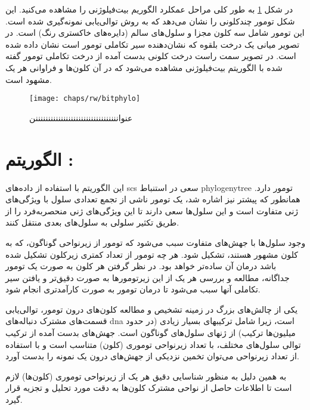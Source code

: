 در شکل \ref{fig:ch_rw:bitphylo} به طور کلی مراحل عمکلرد الگوریم بیت‌فیلوژنی را مشاهده می‌کنید. این شکل تومور چندکلونی  را نشان  می‌دهد که به روش توالی‌یابی نمونه‌گیری شده است. این تومور شامل سه کلون مجزا و سلول‌های سالم (دایره‌های  خاکستری رنگ) است. در تصویر میانی یک درخت بلقوه که نشان‌دهنده سیر تکاملی تومور است نشان داده شده است. در تصویر سمت راست درخت کلونی بدست آمده از درخت تکاملی تومور گفته شده با الگوریتم بیت‌فیلوژنی مشاهده می‌شود که در آن کلون‌ها و فراوانی هر یک مشهود است. 

\begin{figure}[!ht]
	\centerline{\texttt{[image: chaps/rw/bitphylo]}}
	\caption{عنوانننننننننننننننننننننننننننننننننن}
	\label{fig:ch_rw:bitphylo}
\end{figure}



\section{الگوریتم : \cite{jahn2016tree}}

این الگوریتم با استفاده از داده‌های \gls{scs} سعی در استنباط \gls{phylogenytree} تومور دارد. همانطور که پیشتر نیز اشاره شد، یک تومور ناشی از تجمع تعدادی سلول با ویژگی‌های ژنی متفاوت است و این سلول‌ها سعی دارند تا این ویژگی‌های ژنی منحصربه‌فرد را از طریق تکثیر سلولی به سلول‌های بعدی منتقل کنند.  \cite{davis2016computing}

وجود سلول‌ها با جهش‌های متفاوت سبب می‌شود که تومور از زیرنواحی گوناگون، که به کلون مشهور هستند، تشکیل شود. هر چه تومور از تعداد کمتری زیرکلون تشکیل شده باشد درمان آن ساده‌تر خواهد بود. در نظر گرفتن هر کلون به صورت یک تومور جداگانه، مطالعه و بررسی هر یک از این زیرتومورها به صورت دقیق‌تر و یافتن سیر تکاملی آنها سبب می‌شود تا درمان تومور به صورت کارآمدتری انجام شود.  \cite{beerenwinkel2015cancer}


یکی از چالش‌های بزرگ در زمینه تشخیص و مطالعه کلون‌های درون تومور، توالی‌یابی قسمت‌های مشترک دنباله‌های \gls{dna} است، زیرا شامل ترکیبهای بسیار زیادی (در حدود میلیون‌ها ترکیب) از ژنهای سلول‌های گوناگون است. جهش‌های بدست آمده از ترکیب توالی سلول‌های مختلف، با تعداد زیرنواحی توموری (کلون) متناسب است و با استفاده از تعداد زیرنواحی می‌توان تخمین نزدیکی از جهش‌های درون یک نمونه را بدست آورد. \cite{mcgranahan2017clonal}

به همین دلیل به منظور شناسایی دقیق هر یک از زیرنواحی توموری (کلون‌ها) لازم است تا اطلاعات حاصل از نواحی مشترک کلون‌ها به دقت مورد تحلیل و تجزیه قرار گیرد.  \cite{salehi2017ddclone}


